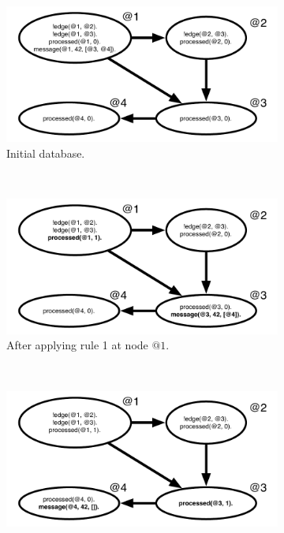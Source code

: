 \begin{figure}[h]
        \centering
        \begin{subfigure}[b]{0.5\textwidth}
                \includegraphics[width=\textwidth]{message_trace1}
                \caption{Initial database.}
                \label{fig:message_trace1}
        \end{subfigure}%
        ~
        \begin{subfigure}[b]{0.5\textwidth}
                \includegraphics[width=\textwidth]{message_trace2}
                \caption{After applying rule 1 at node $@1$.}
                \label{fig:message_trace2}
        \end{subfigure}\\
        \begin{subfigure}[b]{0.5\textwidth}
                \includegraphics[width=\textwidth]{message_trace3}

\end{subfigure}
\end{figure}
